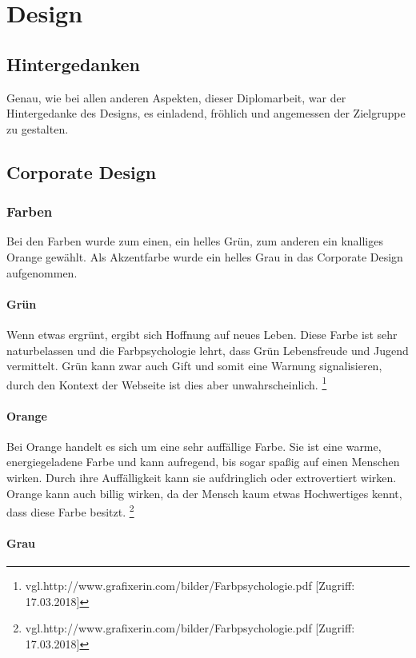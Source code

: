 \chapter{Design}
\renewcommand{\kapitelautor}{Autor: Niklas Kienreich}

\section{Hintergedanken}
Genau, wie bei allen anderen Aspekten, dieser Diplomarbeit, war der Hintergedanke des Designs, es einladend, fröhlich und angemessen der Zielgruppe zu gestalten.

\section{Corporate Design}
\subsection{Farben}
Bei den Farben wurde zum einen, ein helles Grün, zum anderen ein knalliges Orange gewählt. Als Akzentfarbe wurde ein helles Grau in das Corporate Design aufgenommen.

\subsubsection{Grün}
Wenn etwas ergrünt, ergibt sich Hoffnung auf neues Leben. Diese Farbe ist sehr naturbelassen und die Farbpsychologie lehrt, dass Grün Lebensfreude und Jugend vermittelt. Grün kann zwar auch Gift und somit eine Warnung signalisieren, durch den Kontext der Webseite ist dies aber unwahrscheinlich. \footnote{\label{} vgl.http://www.grafixerin.com/bilder/Farbpsychologie.pdf [Zugriff: 17.03.2018]}

\subsubsection{Orange}
Bei Orange handelt es sich um eine sehr auffällige Farbe. Sie ist eine warme, energiegeladene Farbe und kann aufregend, bis sogar spaßig auf einen Menschen wirken. Durch ihre Auffälligkeit kann sie aufdringlich oder extrovertiert wirken. Orange kann auch billig wirken, da der Mensch kaum etwas Hochwertiges kennt, dass diese Farbe besitzt. \footnote{\label{} vgl.http://www.grafixerin.com/bilder/Farbpsychologie.pdf [Zugriff: 17.03.2018]}

\subsubsection{Grau}
